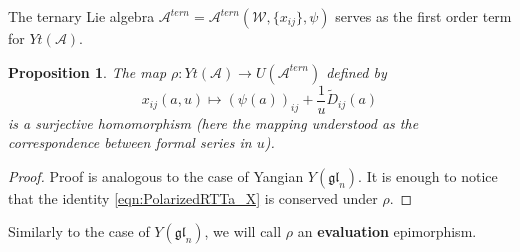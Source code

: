 \documentclass[10pt]{article}%
\numberwithin{equation}{section}
\newtheorem{prop}[thm]{Proposition}
\newcommand{\red}{\color{red}}
\newcommand{\gl}{{\mathfrak{gl}}}
\begin{document}
The ternary Lie algebra $\mathcal{A}^{tern}=\mathcal{A}^{tern}(\mathcal{W}, \{x_{ij}\}, \psi)$ serves as the first order term for $Yt(\mathcal{A})$.
\begin{prop}\label{prop:Evaluation}
  The map  $\rho:Yt(\mathcal{A})\to U(\mathcal{A}^{tern})$ defined by $$x_{ij}(a,u)\mapsto (\psi( a))_{ij}+\frac{1}{u}\widetilde{D}_{ij}(a)$$ is a surjective homomorphism (here the mapping understood as the correspondence between formal series in $u$). %
\end{prop} 
\begin{proof}
    Proof is analogous to the case of Yangian $Y(\gl_n)$. It is enough to notice that the identity \eqref{eqn:PolarizedRTTa_X} is conserved under $\rho$.
\end{proof}
Similarly to the case of $Y(\gl_n)$,  we will call $\rho$ an \textbf{evaluation} epimorphism. 
\end{document}
